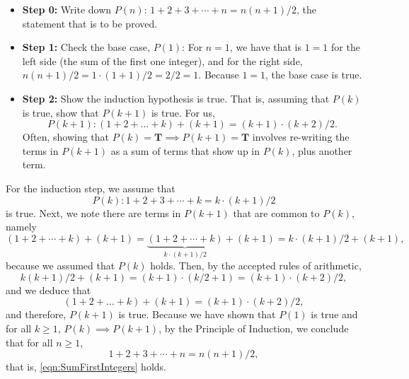    \begin{itemize}
    \item  \textbf{Step 0:} Write down $P(n)$: $1+2 + 3 + \cdots + n = n(n+1)/2$, the statement that is to be proved. 
        \item \textbf{Step 1:} Check the base case, $P(1)$: For  $n=1$, we have that  is $ 1 = 1$ for the left side (the sum of the first one integer), and for the right side, $ n(n+1)/2 = 1\cdot (1+1)/2 = 2/2 = 1 $. Because $1=1$, the base case is true. 
        \item \textbf{Step 2:} Show the induction hypothesis is true. That is, assuming that $P(k)$ is true, show that $P(k+1)$ is true. For us,  
 $$P(k+1): (1+2+\dots +k)+(k+1) = (k+1)\cdot(k+2)/2.$$
 Often, showing that $P(k) = \textbf{T} \implies P(k+1) = \textbf{T}$ involves re-writing the terms in $P(k+1)$ as a sum of terms that show up in $P(k)$, plus another term.\\
  
    \end{itemize}
 
 
For the induction step, we assume that
$$
        P(k): 1+2 + 3 + \cdots + k = k\cdot(k+1)/2
$$
is true. Next, we note there are terms in $P(k+1)$ that are common to $P(k)$, namely 
$$ 
(1+2+\dotsb+k ) + (k+1) = \underbrace{(1+2+\dotsb+k)}_{k\cdot (k+1)/2} +(k+1) = k\cdot (k+1)/2 + (k+1),
$$
because we assumed that $P(k)$ holds. 
Then, by the accepted rules of arithmetic, 
$$       
k(k+1)/2 + (k+1) =(k+1)\cdot ( k/2 + 1 ) =(k+1)\cdot (k+2)/2,
$$
and we deduce that 
$$  (1+2+\dots +k)+(k+1) = (k+1)\cdot(k+2)/2,$$
and therefore, $P(k+1)$ is true. Because we have shown that $P(1)$ is true and for all $k\ge 1$, $P(k) \implies P(k+1)$, by the Principle of Induction, we conclude that for all $n\ge 1$,
$$1+2 + 3 + \cdots + n = n(n+1)/2,$$
that is, \eqref{eqn:SumFirstIntegers} holds.
\Qed
\bigskip


